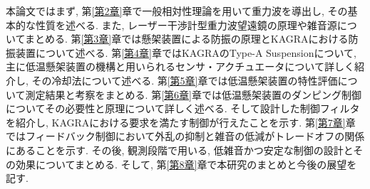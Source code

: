 \noindent
\quad 本論文ではまず, 第\ref{第2章}章で一般相対性理論を用いて重力波を導出し, その基本的な性質を述べる. また, レーザー干渉計型重力波望遠鏡の原理や雑音源についてまとめる. 第\ref{第3章}章では懸架装置による防振の原理とKAGRAにおける防振装置について述べる. 第\ref{第4章}章ではKAGRAのType-A Suspensionについて, 主に低温懸架装置の機構と用いられるセンサ・アクチュエータについて詳しく紹介し, その冷却法について述べる. 第\ref{第5章}章では低温懸架装置の特性評価について測定結果と考察をまとめる. 第\ref{第6章}章では低温懸架装置のダンピング制御についてその必要性と原理について詳しく述べる. そして設計した制御フィルタを紹介し, KAGRAにおける要求を満たす制御が行えたことを示す. 第\ref{第7章}章ではフィードバック制御において外乱の抑制と雑音の低減がトレードオフの関係にあることを示す. その後, 観測段階で用いる, 低雑音かつ安定な制御の設計とその効果についてまとめる. そして, 第\ref{第8章}章で本研究のまとめと今後の展望を記す. 
